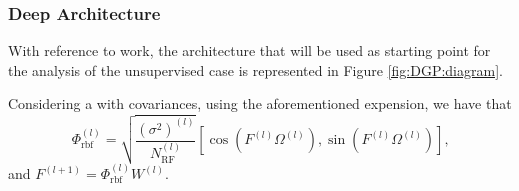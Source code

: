 \subsubsection{Deep Architecture}

With reference to \citet{Filippone2017} work, the architecture that will be used as starting point for the analysis of the unsupervised case is represented in Figure \ref{fig:DGP:diagram}.



Considering a \dgp with \rbf covariances, using the aforementioned expension, we have that
\begin{equation}
\Phi_{\mathrm{rbf}}^{(l)} = \sqrt{\frac{(\sigma^2)^{(l)}}{N_{\mathrm{RF}}^{(l)}}} \left[ \cos\left(F^{(l)} \Omega^{(l)}\right), \sin\left(F^{(l)} \Omega^{(l)}\right) \right] \text{,}
\end{equation}
and
$
F^{(l+1)} = \Phi_{\mathrm{rbf}}^{(l)} W^{(l)} %
$.
